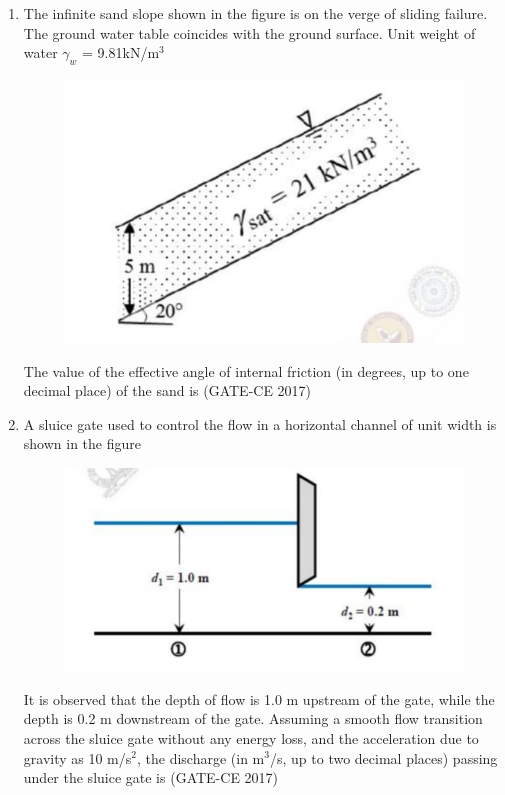 \documentclass[journal,12pt,onecolumn]{article}
\theoremstyle{remark}
\begin{document}
\begin{enumerate}
    \item The infinite sand slope shown in the figure  is on the verge of sliding failure. The ground water table coincides with the ground surface. Unit weight of water $\gamma_w$ = 9.81kN/m$^3$
    \begin{figure}[H]
    \centering
    \includegraphics[width=0.7\columnwidth]{imageq47.jpg}  
    \caption{}
    \label{fig:47}
    \end{figure}
    The value of the effective angle of internal friction (in degrees, up to one decimal place) of the sand is \underline{\hspace{3cm}}\hfill (GATE-CE 2017)

    \item A sluice gate used to control the flow in a horizontal channel of unit width is shown in the figure 
    \begin{figure}[H]
    \centering
    \includegraphics[width=0.7\columnwidth]{imageq48.jpg}  
    \caption{}
    \label{fig:48}
    \end{figure}
    It is observed that the depth of flow is 1.0 m upstream of the gate, while the depth is 0.2 m downstream of the gate. Assuming a smooth flow transition across the sluice gate without any energy loss, and the acceleration due to gravity as 10 m/s$^2$, the discharge (in m$^3$/s, up to two decimal places) passing under the sluice gate is \underline{\hspace{3cm}}\hfill (GATE-CE 2017)


\end{enumerate}
\end{document}
